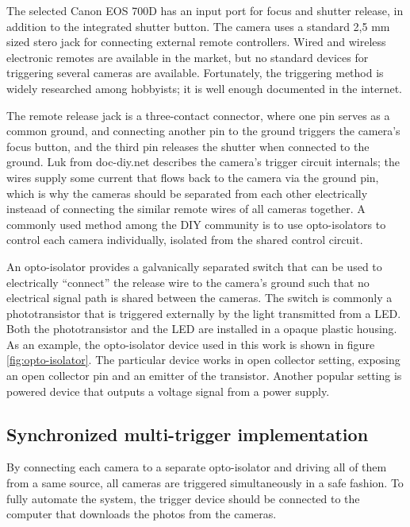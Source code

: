 The selected Canon EOS 700D has an input port for focus and shutter release, in addition to the integrated shutter button.
The camera uses a standard 2,5 mm sized stero jack for connecting external remote controllers.
Wired and wireless electronic remotes are available in the market, but no standard devices for triggering several cameras are available. %
Fortunately, the triggering method is widely researched among hobbyists; it is well enough documented in the internet.

The remote release jack is a three-contact connector, where one pin serves as a common ground, and connecting another pin to the ground triggers the camera's focus button, and the third pin releases the shutter when connected to the ground.
Luk from doc-diy.net \cite{docdiy} describes the camera's trigger circuit internals; the wires supply some current that flows back to the camera via the ground pin, which is why the cameras should be separated from each other electrically insteaad of connecting the similar remote wires of all cameras together.
A commonly used method among the DIY community is to use opto-isolators to control each camera individually, isolated from the shared control circuit.

An opto-isolator provides a galvanically separated switch that can be used to electrically ``connect'' the release wire to the camera's ground such that no electrical signal path is shared between the cameras.
The switch is commonly a phototransistor that is triggered externally by the light transmitted from a LED.
Both the phototransistor and the LED are installed in a opaque plastic housing.
As an example, the opto-isolator device used in this work is shown in figure \ref{fig:opto-isolator}.
The particular device works in open collector setting, exposing an open collector pin and an emitter of the transistor.
Another popular setting is powered device that outputs a voltage signal from a power supply.



\subsection{Synchronized multi-trigger implementation} %

By connecting each camera to a separate opto-isolator and driving all of them from a same source, all cameras are triggered simultaneously in a safe fashion.
To fully automate the system, the trigger device should be connected to the computer that downloads the photos from the cameras.

